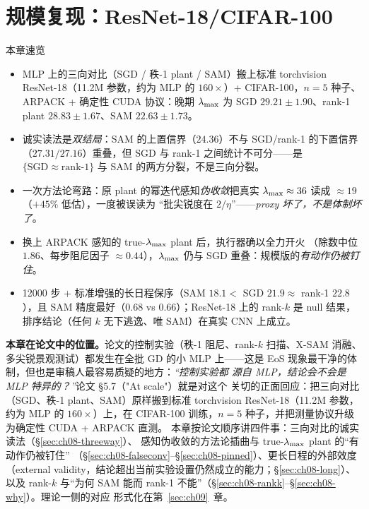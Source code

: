 
\section{规模复现：ResNet-18/CIFAR-100}\label{sec:ch08}

\begin{keybox}{本章速览}
\begin{itemize}
  \item MLP 上的三向对比（SGD / 秩-1 plant / SAM）搬上标准 torchvision
        ResNet-18（11.2M 参数，约为 MLP 的 $160\times$）+ CIFAR-100，$n=5$
        种子、ARPACK + 确定性 CUDA 协议：晚期 $\lambda_{\max}$ 为 SGD
        $29.21\pm1.90$、rank-1 plant $28.83\pm1.67$、SAM $22.63\pm1.73$。
  \item 诚实读法是\emph{双结局}：SAM 的上置信界（$24.36$）不与
        SGD/rank-1 的下置信界（$27.31/27.16$）重叠，但 SGD 与 rank-1
        之间统计不可分——是 $\{\text{SGD}\approx\text{rank-1}\}$ 与 SAM
        的两方分裂，不是三向分裂。
  \item 一次方法论弯路：原 plant 的幂迭代感知\emph{伪收敛}把真实
        $\lambda_{\max}\approx36$ 读成 $\approx19$（$+45\%$ 低估），一度被误读为
        “批尖锐度在 $2/\eta$”——\emph{proxy 坏了，不是体制坏了}。
  \item 换上 ARPACK 感知的 true-$\lambda_{\max}$ plant 后，执行器确以全力开火
        （除数中位 $1.86$、每步阻尼因子 $\approx0.44$），$\lambda_{\max}$ 仍与
        SGD 重叠：规模版的\emph{有动作仍被钉住}。
  \item 12000 步 + 标准增强的长日程保序（SAM $18.1 <$ SGD $21.9\approx$
        rank-1 $22.8$），且 SAM 精度最好（$0.68$ vs $0.66$）；ResNet-18
        上的 rank-$k$ 是 null 结果，排序结论（任何 $k$ 无下逃逸、唯
        SAM）在真实 CNN 上成立。
\end{itemize}
\end{keybox}

\textbf{本章在论文中的位置。}论文的控制实验（秩-1 阻尼、rank-$k$
扫描、X-SAM 消融、多尖锐景观测试）都发生在全批 GD 的小 MLP 上——这是
EoS 现象最干净的体制，但也是审稿人最容易质疑的地方：\emph{“控制实验都
源自 MLP，结论会不会是 MLP 特异的？”}论文 \S5.7（"At scale"）就是对这个
关切的正面回应：把三向对比（SGD、秩-1 plant、SAM）原样搬到标准
torchvision ResNet-18（11.2M 参数，约为 MLP 的 $160\times$）上，在
CIFAR-100 训练，$n=5$ 种子，并把测量协议升级为确定性 CUDA + ARPACK 直测。
本章按论文顺序讲四件事：三向对比的诚实读法（\S\ref{sec:ch08-threeway}）、
感知伪收敛的方法论插曲与 true-$\lambda_{\max}$ plant 的“有动作仍被钉住”
（\S\ref{sec:ch08-falseconv}--\S\ref{sec:ch08-pinned}）、更长日程的外部效度
（external validity，结论超出当前实验设置仍然成立的能力；\S\ref{sec:ch08-long}）、以及 rank-$k$ 与“为何 SAM 能而 rank-1
不能”（\S\ref{sec:ch08-rankk}--\S\ref{sec:ch08-why}）。理论一侧的对应
形式化在第~\ref{sec:ch09}~章。

